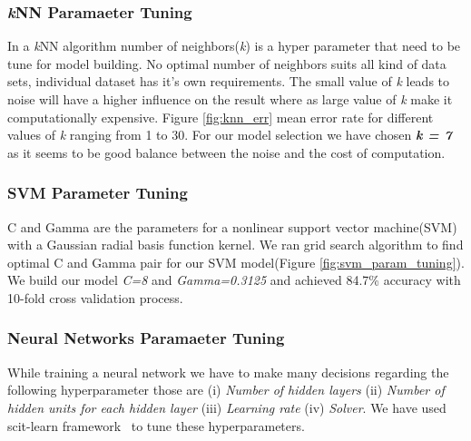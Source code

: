 \subsubsection{\textit{k}NN Paramaeter Tuning}
In a \textit{k}NN algorithm number of neighbors(\textit{k}) is a hyper parameter that need to be tune for model building. No optimal number of neighbors suits all kind of data sets, individual dataset has it's own requirements. The small value of \textit{k} leads to noise will have a higher influence on the result where as large value of \textit{k} make it computationally expensive. Figure \ref{fig:knn_err} mean error rate for different values of \textit{k} ranging from 1 to 30. For our model selection we have chosen \textbf{\textit{k = 7}} as it seems to be good balance between the noise and the cost of computation.

\begin{center}
\begin{figure}[!ht]
\end{figure}
\end{center}

\subsubsection{SVM Parameter Tuning}
C and Gamma are the parameters for a nonlinear support vector machine(SVM) with a Gaussian radial basis function kernel. We ran grid search algorithm to find optimal C and Gamma pair for our SVM model(Figure \ref{fig:svm_param_tuning}). We build our model \textit{C=8} and \textit{Gamma=0.3125} and achieved 84.7\% accuracy with 10-fold cross validation process. 

\begin{center}
\begin{figure}[!ht]
\end{figure}
\end{center}


\subsubsection{Neural Networks Paramaeter Tuning} While training a neural network we have to make many decisions regarding the following hyperparameter those are (i) \textit{Number of hidden layers} (ii) \textit{Number of hidden units for each hidden layer} (iii) \textit{Learning rate } (iv) \textit{ Solver}. We have used scit-learn framework~\cite{scite_learn_framework} to tune these hyperparameters.


